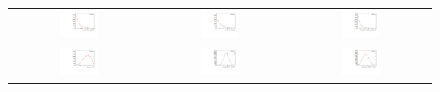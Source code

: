 \begin{figure}
\centering
\begin{tabular}{ccc}
\includegraphics[width=0.3\textwidth]{ANA_resources/Plots/Monte_carlo/data_vs_MC/weight/Kpi/acos(Bd_DIRA_OWNPV)_2016.pdf} & \includegraphics[width=0.3\textwidth]{ANA_resources/Plots/Monte_carlo/data_vs_MC/weight/Kpi/Bd_IPCHI2_OWNPV_2016.pdf} & \includegraphics[width=0.3\textwidth]{ANA_resources/Plots/Monte_carlo/data_vs_MC/weight/Kpi/Bd_LOKI_VFASPF_VCHI2VDOF_2016.pdf} \\
\includegraphics[width=0.3\textwidth]{ANA_resources/Plots/Monte_carlo/data_vs_MC/weight/Kpi/Bd_ptasy_1_50_2016.pdf} & \includegraphics[width=0.3\textwidth]{ANA_resources/Plots/Monte_carlo/data_vs_MC/weight/Kpi/log10(D0_IPCHI2_OWNPV)_2016.pdf} & \includegraphics[width=0.3\textwidth]{ANA_resources/Plots/Monte_carlo/data_vs_MC/weight/Kpi/log10(KstarK_IPCHI2_OWNPV)_2016.pdf} \\

\end{tabular}
\end{figure}
